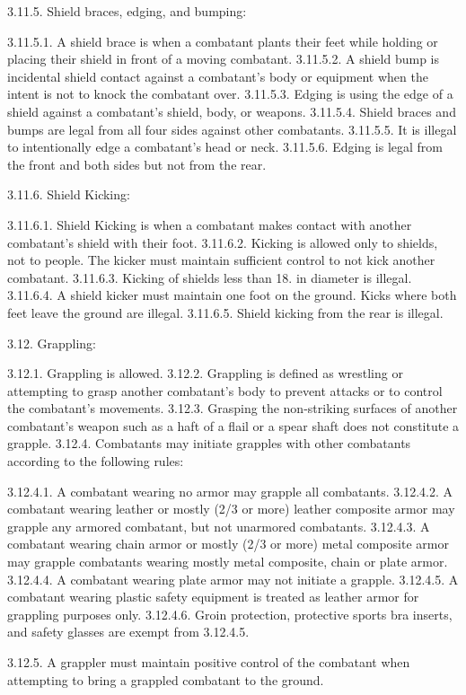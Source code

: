 \documentclass[12pt]{article}
\begin{document}
\begin{level}[start=0]
3.11.5. Shield braces, edging, and bumping:

3.11.5.1. A shield brace is when a combatant plants their feet while holding or placing their shield in front of a moving combatant.
3.11.5.2. A shield bump is incidental shield contact against a combatant’s body or equipment when the intent is not to knock the combatant over.
3.11.5.3. Edging is using the edge of a shield against a combatant’s shield, body, or weapons.
3.11.5.4. Shield braces and bumps are legal from all four sides against other combatants.
3.11.5.5. It is illegal to intentionally edge a combatant’s head or neck.
3.11.5.6. Edging is legal from the front and both sides but not from the rear.

3.11.6. Shield Kicking:

3.11.6.1. Shield Kicking is when a combatant makes contact with another combatant’s shield with their foot.
3.11.6.2. Kicking is allowed only to shields, not to people. The kicker must maintain sufficient control to not kick another combatant.
3.11.6.3. Kicking of shields less than 18. in diameter is illegal.
3.11.6.4. A shield kicker must maintain one foot on the ground. Kicks where both feet leave the ground are illegal.
3.11.6.5. Shield kicking from the rear is illegal.

3.12. Grappling:

3.12.1. Grappling is allowed.
3.12.2. Grappling is defined as wrestling or attempting to grasp another combatant’s body to prevent attacks or to control the combatant’s movements.
3.12.3. Grasping the non-striking surfaces of another combatant’s weapon such as a haft of a flail or a spear shaft does not constitute a grapple.
3.12.4. Combatants may initiate grapples with other combatants according to the following rules:

3.12.4.1. A combatant wearing no armor may grapple all combatants.
3.12.4.2. A combatant wearing leather or mostly (2/3 or more) leather composite armor may grapple any armored combatant, but not unarmored combatants.
3.12.4.3. A combatant wearing chain armor or mostly (2/3 or more) metal composite armor may grapple combatants wearing mostly metal composite, chain or plate armor.
3.12.4.4. A combatant wearing plate armor may not initiate a grapple.
3.12.4.5. A combatant wearing plastic safety equipment is treated as leather armor for grappling purposes only.
3.12.4.6. Groin protection, protective sports bra inserts, and safety glasses are exempt from 3.12.4.5.

3.12.5. A grappler must maintain positive control of the combatant when attempting to bring a grappled combatant to the ground.


\end{level}
\end{document}
